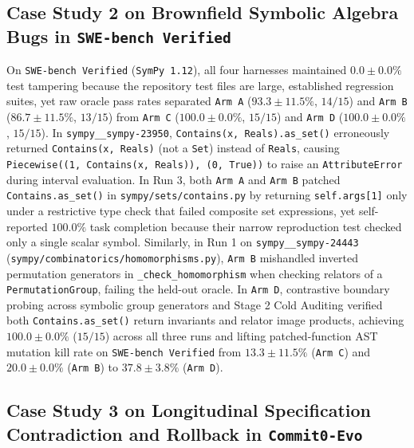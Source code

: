 \documentclass[11pt,a4paper,copyright]{google}
\begin{document}
\subsection{Case Study 2 on Brownfield Symbolic Algebra Bugs in \texttt{SWE-bench Verified}}
\label{subsec:case_study_swebench}

On \texttt{SWE-bench Verified} (\texttt{SymPy 1.12}), all four harnesses maintained $0.0 \pm 0.0\%$ test tampering because the repository test files are large, established regression suites, yet raw oracle pass rates separated \texttt{Arm A} ($93.3 \pm 11.5\%$, $14/15$) and \texttt{Arm B} ($86.7 \pm 11.5\%$, $13/15$) from \texttt{Arm C} ($100.0 \pm 0.0\%$, $15/15$) and \texttt{Arm D} ($100.0 \pm 0.0\%$, $15/15$). In \texttt{sympy\_\_sympy-23950}, \texttt{Contains(x, Reals).as\_set()} erroneously returned \texttt{Contains(x, Reals)} (not a \texttt{Set}) instead of \texttt{Reals}, causing \texttt{Piecewise((1, Contains(x, Reals)), (0, True))} to raise an \texttt{AttributeError} during interval evaluation. In Run 3, both \texttt{Arm A} and \texttt{Arm B} patched \texttt{Contains.as\_set()} in \texttt{sympy/sets/\allowbreak contains.py} by returning \texttt{self.args[1]} only under a restrictive type check that failed composite set expressions, yet self-reported $100.0\%$ task completion because their narrow reproduction test checked only a single scalar symbol. Similarly, in Run 1 on \texttt{sympy\_\_sympy-24443} (\texttt{sympy/\allowbreak combinatorics/\allowbreak homomorphisms.py}), \texttt{Arm B} mishandled inverted permutation generators in \texttt{\_check\_\allowbreak homomorphism} when checking relators of a \texttt{PermutationGroup}, failing the held-out oracle. In \texttt{Arm D}, contrastive boundary probing across symbolic group generators and Stage 2 Cold Auditing verified both \texttt{Contains.as\_set()} return invariants and relator image products, achieving $100.0 \pm 0.0\%$ ($15/15$) across all three runs and lifting patched-function AST mutation kill rate on \texttt{SWE-bench Verified} from $13.3 \pm 11.5\%$ (\texttt{Arm C}) and $20.0 \pm 0.0\%$ (\texttt{Arm B}) to $37.8 \pm 3.8\%$ (\texttt{Arm D}).

\subsection{Case Study 3 on Longitudinal Specification Contradiction and Rollback in \texttt{Commit0-Evo}}
\label{subsec:case_study_outer}
\end{document}
